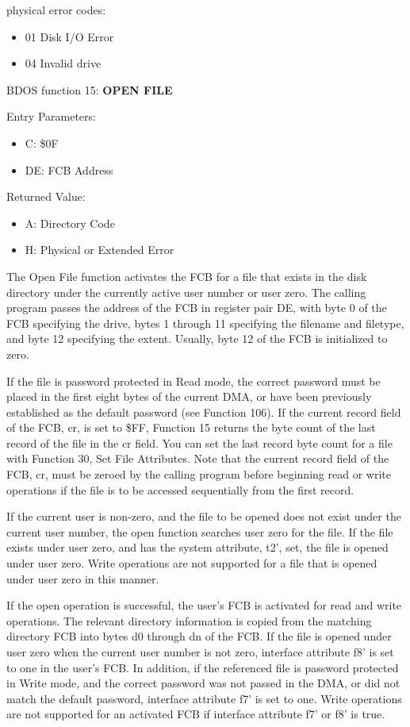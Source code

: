 physical error codes:
\begin{itemize}
\item 01 Disk I/O Error
\item 04 Invalid drive
\end{itemize}

BDOS function 15: \textbf{OPEN FILE}

Entry Parameters:
\begin{itemize}
\item[] C: \$0F
\item[] DE: FCB Address
\end{itemize}

Returned Value:
\begin{itemize}
\item[] A: Directory Code
\item[] H: Physical or Extended Error
\end{itemize}

The Open File function activates the FCB for a file that exists in the
disk directory under the currently active user number or user
zero. The calling program passes the address of the FCB in register
pair DE, with byte 0 of the FCB specifying the drive, bytes 1 through
11 specifying the filename and filetype, and byte 12 specifying the
extent. Usually, byte 12 of the FCB is initialized to zero.

If the file is password protected in Read mode, the correct password
must be placed in the first eight bytes of the current DMA, or have
been previously established as the default password (see Function
106). If the current record field of the FCB, cr, is set to \$FF,
Function 15 returns the byte count of the last record of the file in
the cr field. You can set the last record byte count for a file with
Function 30, Set File Attributes. Note that the current record field
of the FCB, cr, must be zeroed by the calling program before beginning
read or write operations if the file is to be accessed sequentially
from the first record.

If the current user is non-zero, and the file to be opened does not
exist under the current user number, the open function searches user
zero for the file. If the file exists under user zero, and has the
system attribute, t2', set, the file is opened under user zero. Write
operations are not supported for a file that is opened under user zero
in this manner.

If the open operation is successful, the user's FCB is activated for
read and write operations. The relevant directory information is
copied from the matching directory FCB into bytes d0 through dn of the
FCB. If the file is opened under user zero when the current user
number is not zero, interface attribute f8' is set to one in the user's
FCB. In addition, if the referenced file is password protected in
Write mode, and the correct password was not passed in the DMA, or did
not match the default password, interface attribute f7' is set to
one. Write operations are not supported for an activated FCB if
interface attribute f7' or f8' is true.

